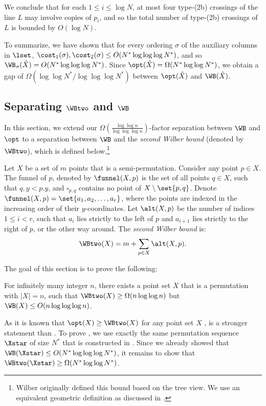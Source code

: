 \documentclass{toc}
\begin{document}
We conclude that for each $1\leq i\leq \log N$, at most four type-(2b) crossings of the line $L$ may involve copies of $p_i$, and so the total number of type-(2b) crossings of $L$ is bounded by $O(\log N)$.


To summarize, we have shown that for every ordering $\sigma$ of the auxiliary columns in $\lset$, $\cost_1(\sigma),\cost_2(\sigma)\leq O(N^*\log\log\log N^*)$, and so $\WB_{\sigma}(\hat X)=O(N^*\log\log\log N^*)$. Since $\opt(\hat X)=\Omega(N^*\log\log N^*)$, we obtain a gap of $\Omega(\log\log N^*/\log\log\log N^*)$ between $\opt(\hat X)$ and $\WB(\hat X)$.

\subsection{Separating $\WBtwo$ and $\WB$}
\label{subsec: separating two wilbers}

In this section, we extend our $\Omega(\frac{\log\log n}{\log\log\log n})$-factor
separation between $\WB$ and $\opt$ to a separation between $\WB$
and the \emph{second Wilber bound} (denoted by $\WBtwo$), which is defined below.\footnote{Wilber originally defined this bound based on the tree view. We use an equivalent geometric definition as discussed in \cite{DHIKP09,in_pursuit}.}


Let $X$ be a set of $m$ points that is a semi-permutation. Consider any point $p\in X$. The funnel of $p$, denoted by $\funnel(X,p)$ is the set of all points $q\in X$, such that $q,y<p.y$, and $\square_{p,q}$ contains no point of $X\setminus\set{p,q}$. 
Denote $\funnel(X,p)=\set{a_1,a_2,\ldots,a_r}$, where the points are indexed in the increasing order of their $y$-coordinates. Let $\alt(X,p)$ be the number of indices $1\leq i<r$, such that $a_i$ lies strictly to the left of $p$ and $a_{i+1}$ lies strictly to the right of $p$, or the other way around. The
\emph{second Wilber bound } is:
\[
\WBtwo(X)=m+\sum_{p\in X}\alt(X,p).
\]


The goal of this section is to prove the following:
\begin{theorem}
\label{thm:sep WBtwo}For infinitely many integer $n$, there exists a point set $X$ that is a permutation with $|X|=n$, such that $\WBtwo(X)\ge\Omega(n\log\log n)$ but $\WB(X)\le O(n\log\log\log n)$.
\end{theorem}

As it is known that $\opt(X)\ge\WBtwo(X)$ for any point set $X$ \cite{wilber},
 is a stronger statement than .
To prove , we use exactly the same permutation
sequence $\Xstar$ of size $N^{*}$ that is constructed in . Since we already showed that  $\WB(\Xstar)\le O(N^{*}\log\log\log N^{*})$, 
it remains to show that $\WBtwo(\Xstar)\ge\Omega(N^{*}\log\log N^{*})$.
\end{document}
